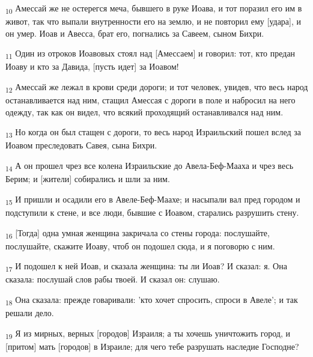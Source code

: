 \begin{tcolorbox}
\textsubscript{10} Амессай же не остерегся меча, бывшего в руке Иоава, и тот поразил его им в живот, так что выпали внутренности его на землю, и не повторил ему [удара], и он умер. Иоав и Авесса, брат его, погнались за Савеем, сыном Бихри.
\end{tcolorbox}
\begin{tcolorbox}
\textsubscript{11} Один из отроков Иоавовых стоял над [Амессаем] и говорил: тот, кто предан Иоаву и кто за Давида, [пусть идет] за Иоавом!
\end{tcolorbox}
\begin{tcolorbox}
\textsubscript{12} Амессай же лежал в крови среди дороги; и тот человек, увидев, что весь народ останавливается над ним, стащил Амессая с дороги в поле и набросил на него одежду, так как он видел, что всякий проходящий останавливался над ним.
\end{tcolorbox}
\begin{tcolorbox}
\textsubscript{13} Но когда он был стащен с дороги, то весь народ Израильский пошел вслед за Иоавом преследовать Савея, сына Бихри.
\end{tcolorbox}
\begin{tcolorbox}
\textsubscript{14} А он прошел чрез все колена Израильские до Авела-Беф-Мааха и чрез весь Берим; и [жители] собирались и шли за ним.
\end{tcolorbox}
\begin{tcolorbox}
\textsubscript{15} И пришли и осадили его в Авеле-Беф-Маахе; и насыпали вал пред городом и подступили к стене, и все люди, бывшие с Иоавом, старались разрушить стену.
\end{tcolorbox}
\begin{tcolorbox}
\textsubscript{16} [Тогда] одна умная женщина закричала со стены города: послушайте, послушайте, скажите Иоаву, чтоб он подошел сюда, и я поговорю с ним.
\end{tcolorbox}
\begin{tcolorbox}
\textsubscript{17} И подошел к ней Иоав, и сказала женщина: ты ли Иоав? И сказал: я. Она сказала: послушай слов рабы твоей. И сказал он: слушаю.
\end{tcolorbox}
\begin{tcolorbox}
\textsubscript{18} Она сказала: прежде говаривали: 'кто хочет спросить, спроси в Авеле'; и так решали дело.
\end{tcolorbox}
\begin{tcolorbox}
\textsubscript{19} Я из мирных, верных [городов] Израиля; а ты хочешь уничтожить город, и [притом] мать [городов] в Израиле; для чего тебе разрушать наследие Господне?
\end{tcolorbox}
